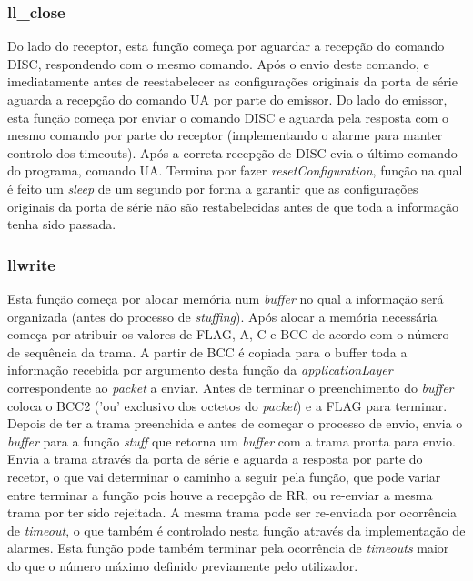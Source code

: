 \documentclass[11pt]{article}
\begin{document}
  \subsubsection{ll\_close}
   
    Do lado do receptor, esta função começa por aguardar a recepção do comando DISC, respondendo com o mesmo comando. Após o envio deste comando, e imediatamente antes de reestabelecer as configurações originais da porta de série aguarda a recepção do comando UA por parte do emissor.
	Do lado do emissor, esta função começa por enviar o comando DISC e aguarda pela resposta com o mesmo comando por parte do receptor (implementando o alarme para manter controlo dos timeouts). Após a correta recepção de DISC evia o último comando do programa, comando UA.
    Termina por fazer \textit{resetConfiguration}, função na qual é feito um \textit{sleep} de um segundo por forma a garantir que as configurações originais da porta de série não são restabelecidas antes de que toda a informação tenha sido passada.
   
 \subsubsection{llwrite}
    
	Esta função começa por alocar memória num \textit{buffer} no qual a informação será organizada (antes do processo de \textit{stuffing}). Após alocar a memória necessária começa por atribuir os valores de FLAG, A, C e BCC de acordo com o número de sequência da trama. A partir de BCC é copiada para o buffer toda a informação recebida por argumento desta função da \textit{applicationLayer} correspondente ao \textit{packet} a enviar. Antes de terminar o preenchimento do \textit{buffer} coloca o BCC2 ('ou' exclusivo dos octetos do \textit{packet}) e a FLAG para terminar.
	Depois de ter a trama preenchida e antes de começar o processo de envio, envia o \textit{buffer} para a função \textit{stuff} que retorna um \textit{buffer} com a trama pronta para envio.
	Envia a trama através da porta de série e aguarda a resposta por parte do recetor, o que vai determinar o caminho a seguir pela função, que pode variar entre terminar a função pois houve a recepção de RR, ou re-enviar a mesma trama por ter sido rejeitada.
	A mesma trama pode ser re-enviada por ocorrência de \textit{timeout}, o que também é controlado nesta função através da implementação de alarmes.
	Esta função pode também terminar pela ocorrência de \textit{timeouts} maior do que o número máximo definido previamente pelo utilizador.
	
\end{document}
